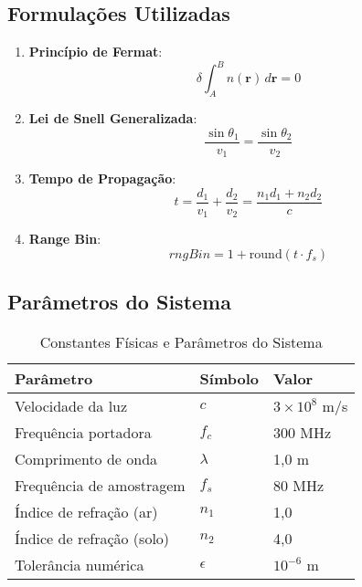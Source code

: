 \documentclass[12pt,a4paper]{article}
\begin{document}
\subsection{Formulações Utilizadas}

\begin{enumerate}
    \item \textbf{Princípio de Fermat}: 
    \begin{equation}
    \delta \int_A^B n(\mathbf{r}) \, d\mathbf{r} = 0
    \end{equation}
    
    \item \textbf{Lei de Snell Generalizada}:
    \begin{equation}
    \frac{\sin \theta_1}{v_1} = \frac{\sin \theta_2}{v_2}
    \end{equation}
    
    \item \textbf{Tempo de Propagação}:
    \begin{equation}
    t = \frac{d_1}{v_1} + \frac{d_2}{v_2} = \frac{n_1 d_1 + n_2 d_2}{c}
    \end{equation}
    
    \item \textbf{Range Bin}:
    \begin{equation}
    rngBin = 1 + \text{round}(t \cdot f_s)
    \end{equation}
\end{enumerate}

\subsection{Parâmetros do Sistema}

\begin{table}[H]
\centering
\caption{Constantes Físicas e Parâmetros do Sistema}
\begin{tabular}{@{}lll@{}}
\toprule
\textbf{Parâmetro} & \textbf{Símbolo} & \textbf{Valor} \\
\midrule
Velocidade da luz & $c$ & $3 \times 10^8$ m/s \\
Frequência portadora & $f_c$ & 300 MHz \\
Comprimento de onda & $\lambda$ & 1,0 m \\
Frequência de amostragem & $f_s$ & 80 MHz \\
Índice de refração (ar) & $n_1$ & 1,0 \\
Índice de refração (solo) & $n_2$ & 4,0 \\
Tolerância numérica & $\epsilon$ & $10^{-6}$ m \\
\bottomrule
\end{tabular}
\end{table}
\end{document}
